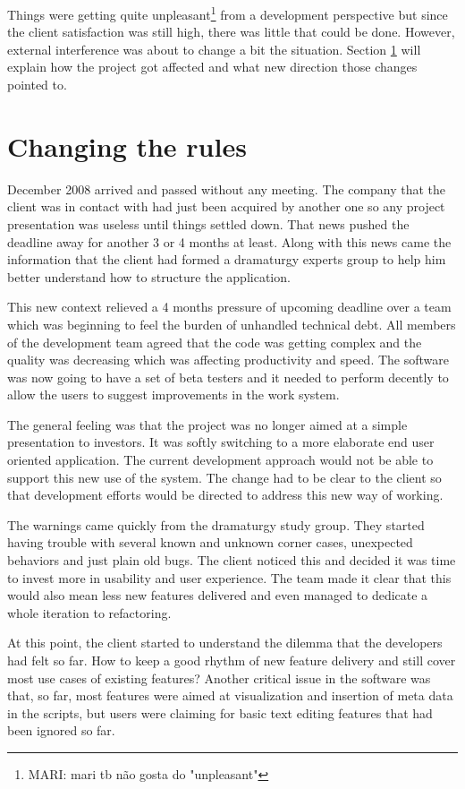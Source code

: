 \documentclass[lnbip]{svmultln}
\newcommand{\mari}[1]{\footnote{MARI: #1}}
\begin{document}
Things were getting quite unpleasant\mari{mari tb não gosta do "unpleasant"}
from a development perspective but since the client satisfaction was still high,
there was little that could be done. However, external interference was about to
change a bit the situation. Section \ref{sec:changes} will explain how the
project got affected and what new direction those changes pointed to.

\section{Changing the rules}
\label{sec:changes}

December 2008 arrived and passed without any meeting. The company that
the client was in contact with had just been acquired by another one
so any project presentation was useless until things settled
down. That news pushed the deadline away for another 3 or 4 months at
least. Along with this news came the information that the client had
formed a dramaturgy experts group to help him better understand how to
structure the application.

This new context relieved a 4 months pressure of upcoming deadline
over a team which was beginning to feel the burden of unhandled
technical debt. All members of the development team agreed that the
code was getting complex and the quality was decreasing which was
affecting productivity and speed. The software was now going to have a
set of beta testers and it needed to perform decently to allow the
users to suggest improvements in the work system.

The general feeling was that the project was no longer aimed at a
simple presentation to investors. It was softly switching to a more
elaborate end user oriented application. The current development
approach would not be able to support this new use of the system. The
change had to be clear to the client so that development efforts would
be directed to address this new way of working.

The warnings came quickly from the dramaturgy study group. They
started having trouble with several known and unknown corner cases,
unexpected behaviors and just plain old bugs. The client noticed this
and decided it was time to invest more in usability and user
experience. The team made it clear that this would also mean less new
features delivered and even managed to dedicate a whole iteration to
refactoring.

At this point, the client started to understand the dilemma that the
developers had felt so far. How to keep a good rhythm of new feature
delivery and still cover most use cases of existing features? Another
critical issue in the software was that, so far, most features were
aimed at visualization and insertion of meta data in the scripts, but
users were claiming for basic text editing features that had been
ignored so far.
\end{document}
